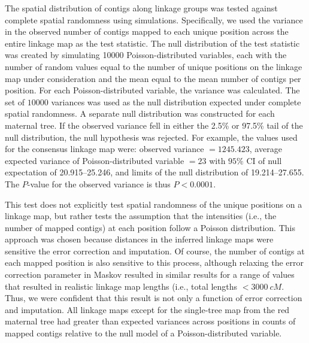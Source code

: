 \documentclass[smallextended]{svjour3}
\begin{document}
The spatial distribution of contigs along linkage groups was tested against
complete spatial randomness using simulations.  Specifically, we used the
variance in the observed number of contigs mapped to each unique position across
the entire linkage map as the test statistic. The null distribution of the test
statistic was created by simulating \num{10000} Poisson-distributed variables,
each with the number of random values equal to the number of unique positions on
the linkage map under consideration and the mean equal to the mean number of
contigs per position. For each Poisson-distributed variable, the variance was
calculated. The set of $10000$ variances was used as the null distribution
expected under complete spatial randomness. A separate null distribution was
constructed for each maternal tree. If the observed variance fell in either the
2.5\% or 97.5\% tail of the null distribution, the null hypothesis was
rejected. For example, the values used for the consensus linkage map were:
observed variance $= 1245.423$, average expected variance of Poisson-distributed
variable $= 23$ with $95\%$ CI of null expectation of 20.915--25.246, and limits
of the null distribution of 19.214--27.655.  The $P$-value for the observed
variance is thus $P < 0.0001$.

This test does not explicitly test spatial randomness of the unique positions on
a linkage map, but rather tests the assumption that the intensities (i.e., the
number of mapped contigs) at each position follow a Poisson distribution.  This
approach was chosen because distances in the inferred linkage maps were
sensitive the error correction and imputation. Of course, the number of contigs
at each mapped position is also sensitive to this process, although relaxing the
error correction parameter in Maskov resulted in similar results for a range of
values that resulted in realistic linkage map lengths (i.e., total lengths $<
\SI{3000}{cM}$. Thus, we were confident that this result is not only a function
of error correction and imputation. All linkage maps except for the single-tree
map from the red maternal tree had greater than expected variances across
positions in counts of mapped contigs relative to the null model of a
Poisson-distributed variable.
\end{document}
